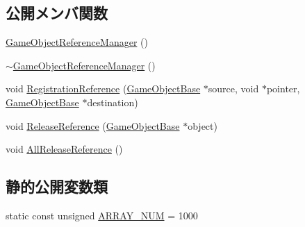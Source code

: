 \subsection*{公開メンバ関数}
\begin{DoxyCompactItemize}
\item 
\mbox{\hyperlink{class_game_object_reference_manager_aed165af9f1a16894c65f974945020cda}{Game\+Object\+Reference\+Manager}} ()
\item 
\mbox{\hyperlink{class_game_object_reference_manager_a9ed62220afb840cdc3e8cbe4bbc3a19e}{$\sim$\+Game\+Object\+Reference\+Manager}} ()
\item 
void \mbox{\hyperlink{class_game_object_reference_manager_a4195eafdda534044454b6d48efc7d03d}{Registration\+Reference}} (\mbox{\hyperlink{class_game_object_base}{Game\+Object\+Base}} $\ast$source, void $\ast$pointer, \mbox{\hyperlink{class_game_object_base}{Game\+Object\+Base}} $\ast$destination)
\item 
void \mbox{\hyperlink{class_game_object_reference_manager_ac7d117427de3052f893228408a3de5d7}{Release\+Reference}} (\mbox{\hyperlink{class_game_object_base}{Game\+Object\+Base}} $\ast$object)
\item 
void \mbox{\hyperlink{class_game_object_reference_manager_ac4852ddd6d8bd5e1f13284ba6204e221}{All\+Release\+Reference}} ()
\end{DoxyCompactItemize}
\subsection*{静的公開変数類}
\begin{DoxyCompactItemize}
\item 
static const unsigned \mbox{\hyperlink{class_game_object_reference_manager_a962d30b10c5b76353645773b2c1740ce}{A\+R\+R\+A\+Y\+\_\+\+N\+UM}} = 1000
\end{DoxyCompactItemize}
